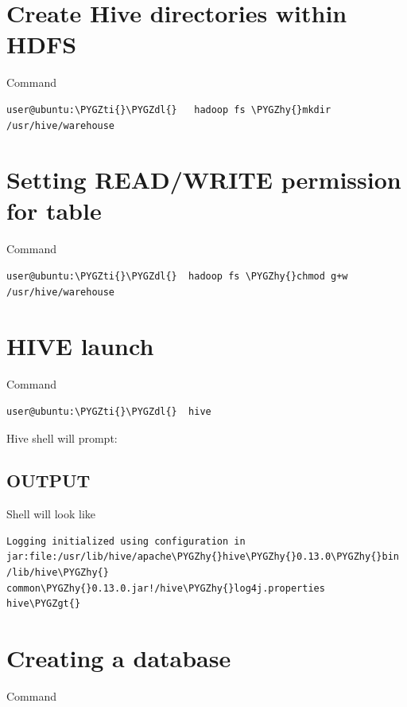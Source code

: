 \documentclass[a4paper,12pt,oneside]{sphinxmanual}
\def\PYGZgt{\char`\>}
\def\PYGZdl{\char`\$}
\def\PYGZhy{\char`\-}
\def\PYGZti{\char`\~}
\begin{document}
\section{Create Hive directories within HDFS}
\label{document:create-hive-directories-within-hdfs}
Command

\begin{Verbatim}[commandchars=\\\{\}]
user@ubuntu:\PYGZti{}\PYGZdl{}   hadoop fs \PYGZhy{}mkdir /usr/hive/warehouse
\end{Verbatim}


\section{Setting READ/WRITE permission for table}
\label{document:setting-read-write-permission-for-table}
Command

\begin{Verbatim}[commandchars=\\\{\}]
user@ubuntu:\PYGZti{}\PYGZdl{}  hadoop fs \PYGZhy{}chmod g+w /usr/hive/warehouse
\end{Verbatim}


\section{HIVE launch}
\label{document:hive-launch}
Command

\begin{Verbatim}[commandchars=\\\{\}]
user@ubuntu:\PYGZti{}\PYGZdl{}  hive
\end{Verbatim}

Hive shell will prompt:


\subsection{OUTPUT}
\label{document:output}
Shell will look like

\begin{Verbatim}[commandchars=\\\{\}]
Logging initialized using configuration in
jar:file:/usr/lib/hive/apache\PYGZhy{}hive\PYGZhy{}0.13.0\PYGZhy{}bin
/lib/hive\PYGZhy{} common\PYGZhy{}0.13.0.jar!/hive\PYGZhy{}log4j.properties
hive\PYGZgt{}
\end{Verbatim}


\section{Creating a database}
\label{document:creating-a-database}
Command
\end{document}
